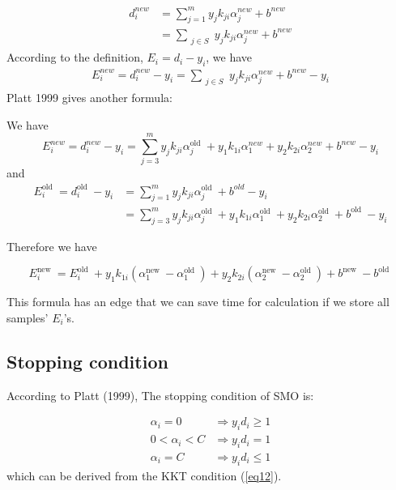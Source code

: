 \documentclass{article}
\begin{document}
$$
\begin{aligned}
d_i^{n e w} &=\sum_{j=1}^m y_j k_{j i} \alpha_j^{n e w}+b^{n e w} \\
&=\sum_{\substack{j \in S}} y_j k_{j i} \alpha_j^{n e w}+b^{n e w}
\end{aligned}
$$
According to the definition, $E_i=d_i-y_i$, we have
$$
\begin{aligned}
E_i^{n e w}=d_i^{n e w}-y_i
=\sum_{\substack{j \in S}} y_j k_{j i} \alpha_j^{n e w}+b^{n e w}-y_i
\end{aligned}
$$
Platt 1999 gives another formula:

We have
$$
E_i^{n e w}=d_i^{n e w}-y_i=\sum_{j=3}^m y_j k_{j i} \alpha_j^{\text {old }}+y_1 k_{1 i} \alpha_1^{n e w}+y_2 k_{2 i} \alpha_2^{n e w}+b^{n e w}-y_i
$$
and
$$
\begin{aligned}
E_i^{\text {old }}=d_i^{\text {old }}-y_i &=\sum_{j=1}^m y_j k_{j i} \alpha_j^{\text {old }}+b^{o l d}-y_i \\
&=\sum_{j=3}^m y_j k_{j i} \alpha_j^{\text {old }}+y_1 k_{1 i} \alpha_1^{\text {old }}+y_2 k_{2 i} \alpha_2^{\text {old }}+b^{\text {old }}-y_i
\end{aligned}
$$

Therefore we have 

\begin{equation}
E_i^{\text {new }}=E_i^{\text {old }}+y_1 k_{1 i}\left(\alpha_1^{\text {new }}-\alpha_1^{\text {old }}\right)+y_2 k_{2 i}\left(\alpha_2^{\text {new }}-\alpha_2^{\text {old }}\right)+b^{\text {new }}-b^{\text {old }}
\end{equation}

This formula has an edge that we can save time for calculation if we store all samples' $E_i$'s.

\subsection{Stopping condition}

According to Platt (1999), The stopping condition of SMO is:

\begin{equation}
\begin{aligned}
\alpha_i=0 & \Rightarrow y_i d_i \geq 1 \\
0<\alpha_i<C & \Rightarrow y_i d_i=1 \\
\alpha_i=C & \Rightarrow y_i d_i \leq 1
\end{aligned}
\end{equation}
which can be derived from the KKT condition (\ref{eq12}).
\end{document}
